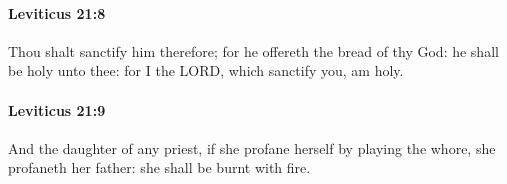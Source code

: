 		\paragraph{Leviticus 21:8} %
			\label{LEVITICUS-21-8}

			Thou shalt sanctify him therefore; for he offereth the bread of thy God: he shall be holy unto thee: for I the LORD, which sanctify you, am holy.


		\paragraph{Leviticus 21:9} %
			\label{LEVITICUS-21-9}

			And the daughter of any priest, if she profane herself by playing the whore, she profaneth her father: she shall be burnt with fire.


